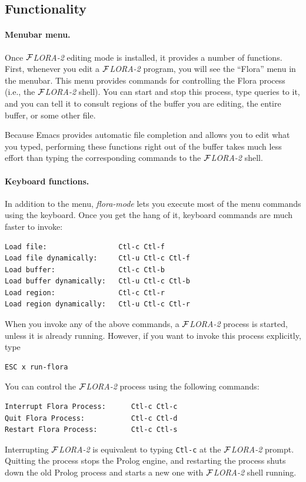 \documentclass[11pt]{article}
\newcommand{\FLORA}{{\mbox{${\cal F}${\small\it LORA}\rm\emph{-2}}}\xspace}
\begin{document}
\subsection{Functionality}


\paragraph{Menubar menu.}
Once \FLORA editing mode is installed, it provides a number of functions.
First, whenever you edit a \FLORA program, you will see the ``Flora'' menu
in the menubar. This menu provides commands for controlling the Flora
process (i.e., the \FLORA shell). You can start and stop
this process, type queries to it, and you can tell it to consult regions of
the buffer you are editing, the entire buffer, or some other file.

Because Emacs provides automatic file completion and allows you to edit
what you typed, performing these functions right out of the buffer takes
much less effort than typing the corresponding commands to the \FLORA
shell.

\paragraph{Keyboard functions.}
In addition to the menu, \emph{flora-mode} lets you execute most of the
menu commands using the keyboard. Once you get the hang of it, keyboard
commands are much faster to invoke:
\begin{verbatim}
Load file:                 Ctl-c Ctl-f
Load file dynamically:     Ctl-u Ctl-c Ctl-f
Load buffer:               Ctl-c Ctl-b
Load buffer dynamically:   Ctl-u Ctl-c Ctl-b
Load region:               Ctl-c Ctl-r
Load region dynamically:   Ctl-u Ctl-c Ctl-r
\end{verbatim}
When you invoke any of the above commands, a \FLORA process is started,
unless it is already running. However, if you want to invoke this process
explicitly, type
\begin{verbatim}
ESC x run-flora  
\end{verbatim}
You can control the \FLORA process using the following commands:
\begin{verbatim}
Interrupt Flora Process:      Ctl-c Ctl-c
Quit Flora Process:           Ctl-c Ctl-d
Restart Flora Process:        Ctl-c Ctl-s
\end{verbatim}
Interrupting \FLORA is equivalent to typing {\tt Ctl-c} at the \FLORA
prompt. Quitting the process stops the Prolog engine, and restarting the
process shuts down the old Prolog process and starts a new one with \FLORA
shell running. 
\end{document}
